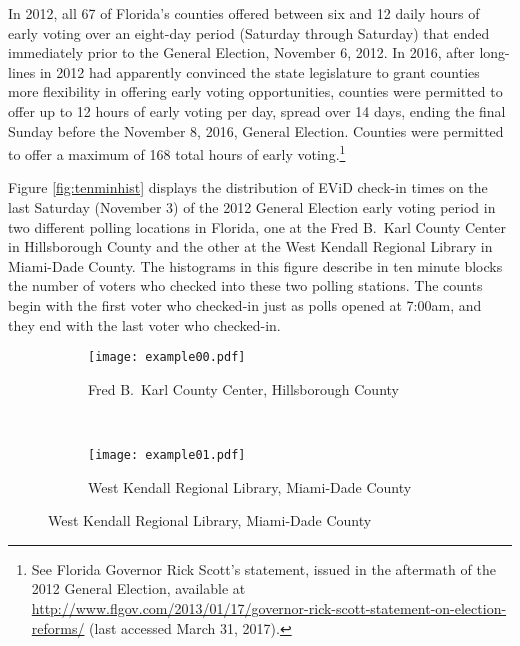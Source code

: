 \documentclass[12pt,titlepage]{article}
\begin{document}



In 2012, all 67 of Florida's counties offered between six and 12 daily
hours of early voting over an eight-day period (Saturday through
Saturday) that ended immediately prior to the General Election,
November 6, 2012.  In 2016, after long-lines in 2012 had apparently
convinced the state legislature to grant counties more flexibility in
offering early voting opportunities, counties were permitted to offer
up to 12 hours of early voting per day, spread over 14 days, ending
the final Sunday before the November 8, 2016, General Election.
Counties were permitted to offer a maximum of 168 total hours of early
voting.\footnote{See Florida Governor Rick Scott's statement, issued
  in the aftermath of the 2012 General Election, available at
  \url{http://www.flgov.com/2013/01/17/governor-rick-scott-statement-on-election-reforms/}
  (last accessed March 31, 2017).}

Figure \ref{fig:tenminhist} displays the distribution of EViD check-in
times on the last Saturday (November 3) of the 2012 General Election
early voting period in two different polling locations in Florida,
one at the Fred B.\ Karl County Center in Hillsborough County and the
other at the West Kendall Regional Library in Miami-Dade County.  The
histograms in this figure describe in ten minute blocks the number of
voters who checked into these two polling stations.  The counts begin
with the first voter who checked-in just as polls opened at 7:00am,
and they end with the last voter who checked-in.

\begin{figure}[!ht]
  \caption{Early voting check-in times on Saturday, November 3, 2012, in two Florida locations}
  \label{fig:tenminhist}
  \centering
  \begin{subfigure}[b]{\linewidth}
    \centering\texttt{[image: example00.pdf]}
    \caption{Fred B.\ Karl County Center, Hillsborough County}
    \label{fig:karlexample}
  \end{subfigure}%
  \\
  \begin{subfigure}[b]{\linewidth}
    \centering\texttt{[image: example01.pdf]}
    \caption{West Kendall Regional Library, Miami-Dade County}
    \label{fig:kendallexample}
  \end{subfigure}
\end{figure}
\end{document}
